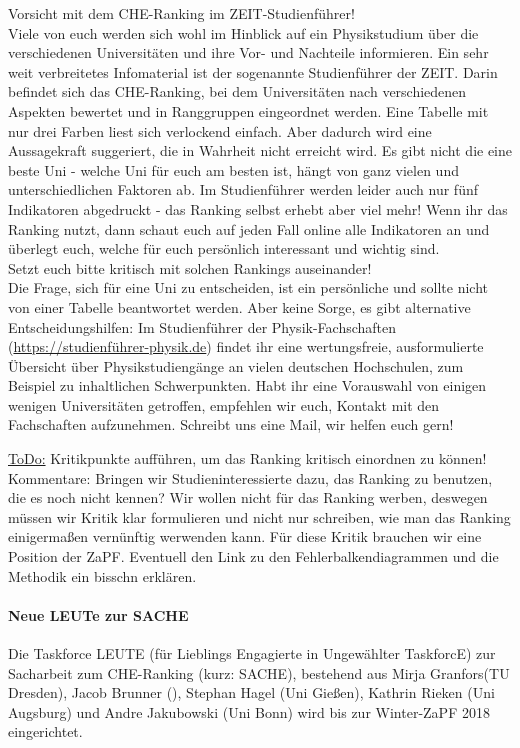       Vorsicht mit dem CHE-Ranking im ZEIT-Studienführer! \\
      Viele von euch werden sich wohl im Hinblick auf ein Physikstudium über die verschiedenen Universitäten und ihre Vor- und Nachteile informieren. Ein sehr weit verbreitetes Infomaterial ist der sogenannte Studienführer der ZEIT. Darin befindet sich das CHE-Ranking, bei dem Universitäten nach verschiedenen Aspekten bewertet und in Ranggruppen eingeordnet werden.
      Eine Tabelle mit nur drei Farben liest sich verlockend einfach. Aber dadurch wird eine Aussagekraft suggeriert, die in Wahrheit nicht erreicht wird.
      Es gibt nicht die eine beste Uni -  welche Uni für euch am besten ist, hängt von ganz vielen und unterschiedlichen Faktoren ab.
      Im Studienführer werden leider auch nur fünf Indikatoren abgedruckt - das Ranking selbst erhebt aber viel mehr! Wenn ihr das Ranking nutzt, dann schaut euch auf jeden Fall online alle Indikatoren an und überlegt euch, welche für euch persönlich interessant und wichtig sind. \\

      Setzt euch bitte kritisch mit solchen Rankings auseinander! \\

      Die Frage, sich für eine Uni zu entscheiden, ist ein persönliche und sollte nicht von einer Tabelle beantwortet werden. Aber keine Sorge, es gibt alternative Entscheidungshilfen: Im Studienführer der Physik-Fachschaften (\url{https://studienführer-physik.de}) findet ihr eine wertungsfreie, ausformulierte Übersicht über Physikstudiengänge an vielen deutschen Hochschulen, zum Beispiel zu inhaltlichen Schwerpunkten.
      Habt ihr eine Vorauswahl von einigen wenigen Universitäten getroffen, empfehlen wir euch, Kontakt mit den Fachschaften aufzunehmen. Schreibt uns eine Mail, wir helfen euch gern! 

      \underline{ToDo:} Kritikpunkte aufführen, um das Ranking kritisch einordnen zu können!
      Kommentare: Bringen wir Studieninteressierte dazu, das Ranking zu benutzen, die es noch nicht kennen?
      Wir wollen nicht für das Ranking werben, deswegen müssen wir Kritik klar formulieren und nicht nur schreiben, wie man das Ranking einigermaßen vernünftig werwenden kann. Für diese Kritik brauchen wir eine Position der ZaPF.
      Eventuell den Link zu den Fehlerbalkendiagrammen und die Methodik ein bisschn erklären.

    \paragraph{Neue LEUTe zur SACHE}
      Die Taskforce LEUTE (für Lieblings Engagierte in Ungewählter TaskforcE) zur Sacharbeit zum CHE-Ranking (kurz: SACHE), bestehend aus Mirja Granfors(TU Dresden), Jacob Brunner (), Stephan Hagel (Uni Gießen), Kathrin Rieken (Uni Augsburg) und Andre Jakubowski (Uni Bonn) wird bis zur Winter-ZaPF 2018 eingerichtet. \\

